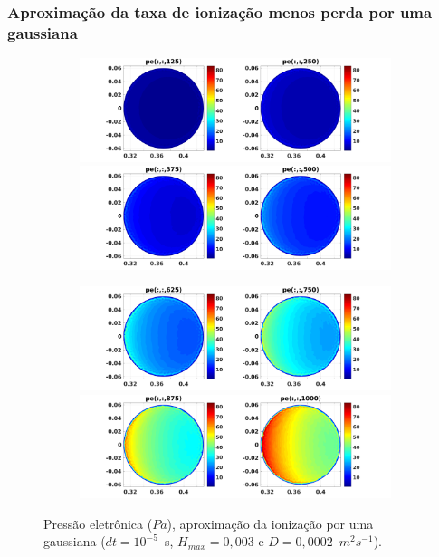 \documentclass[aspectratio=169]{beamer}
\begin{document}
\begin{frame}
\frametitle{Aproximação da taxa de ionização menos perda por uma gaussiana}
\begin{figure}[H]
\begin{subfigure}{0.43\textwidth}
\includegraphics[scale=0.24]{../SImulacao_breakdown/PDE/petod1B6.png}  
\includegraphics[scale=0.24]{../SImulacao_breakdown/PDE/petod2B6.png} 
\end{subfigure}
\begin{subfigure}{0.43\textwidth}
\includegraphics[scale=0.24]{../SImulacao_breakdown/PDE/petod3B6.png} 
\includegraphics[scale=0.24]{../SImulacao_breakdown/PDE/petod4B6.png} 
\end{subfigure}
\caption{Pressão eletrônica ($Pa$), aproximação da ionização por uma gaussiana ($dt=10^{-5}$\ s, $H_{max} = 0,003$ e $D=0,0002$\ $m^2s^{-1}$).}
\label{pressaoB}
\end{figure}
\end{frame}
\end{document}
